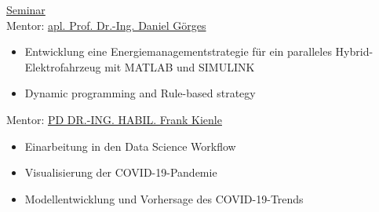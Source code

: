 \href{https://www.eit.uni-kl.de/en/jem/teaching/seminar-electromobility/}{\color{blue} Seminar}\\
Mentor: \href{https://www.eit.uni-kl.de/en/jem/team/}{\color{blue}\hspace{.25em} apl. Prof. Dr.-Ing. Daniel Görges}
\begin{itemize}
	\item Entwicklung eine Energiemanagementstrategie für ein paralleles Hybrid-Elektrofahrzeug mit MATLAB und SIMULINK
	\item Dynamic programming and Rule-based strategy
\end{itemize}
\SmallSep

Mentor: \href{https://ems.eit.uni-kl.de/en/staff/frank-kienle/}{\color{blue}\hspace{.25em} PD DR.-ING. HABIL. Frank Kienle}
\begin{itemize}
	\item Einarbeitung in den Data Science Workflow
	\item Visualisierung der COVID-19-Pandemie
	\item Modellentwicklung und Vorhersage des COVID-19-Trends
\end{itemize}
\SmallSep

